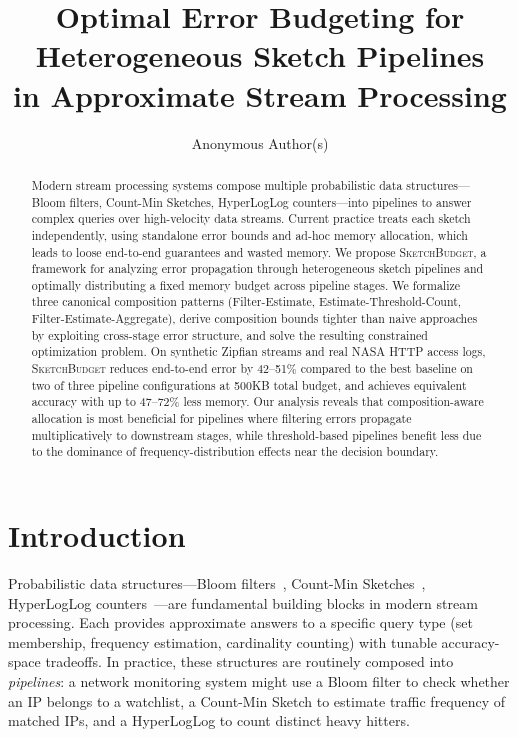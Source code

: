 \documentclass[preprint]{article}
\title{Optimal Error Budgeting for Heterogeneous Sketch Pipelines\\in Approximate Stream Processing}
\author{
  Anonymous Author(s)
}
\newcommand{\SketchBudget}{\textsc{SketchBudget}}
\begin{document}
\maketitle

\begin{abstract}
Modern stream processing systems compose multiple probabilistic data structures---Bloom filters, Count-Min Sketches, HyperLogLog counters---into pipelines to answer complex queries over high-velocity data streams. Current practice treats each sketch independently, using standalone error bounds and ad-hoc memory allocation, which leads to loose end-to-end guarantees and wasted memory. We propose \SketchBudget{}, a framework for analyzing error propagation through heterogeneous sketch pipelines and optimally distributing a fixed memory budget across pipeline stages. We formalize three canonical composition patterns (Filter-Estimate, Estimate-Threshold-Count, Filter-Estimate-Aggregate), derive composition bounds tighter than naive approaches by exploiting cross-stage error structure, and solve the resulting constrained optimization problem. On synthetic Zipfian streams and real NASA HTTP access logs, \SketchBudget{} reduces end-to-end error by 42--51\% compared to the best baseline on two of three pipeline configurations at 500KB total budget, and achieves equivalent accuracy with up to 47--72\% less memory. Our analysis reveals that composition-aware allocation is most beneficial for pipelines where filtering errors propagate multiplicatively to downstream stages, while threshold-based pipelines benefit less due to the dominance of frequency-distribution effects near the decision boundary.
\end{abstract}

\section{Introduction}

Probabilistic data structures---Bloom filters~\citep{bloom1970space}, Count-Min Sketches~\citep{Cormode2005CountMin}, HyperLogLog counters~\citep{flajolet2007hyperloglog}---are fundamental building blocks in modern stream processing. Each provides approximate answers to a specific query type (set membership, frequency estimation, cardinality counting) with tunable accuracy-space tradeoffs. In practice, these structures are routinely composed into \emph{pipelines}: a network monitoring system might use a Bloom filter to check whether an IP belongs to a watchlist, a Count-Min Sketch to estimate traffic frequency of matched IPs, and a HyperLogLog to count distinct heavy hitters.
\end{document}
